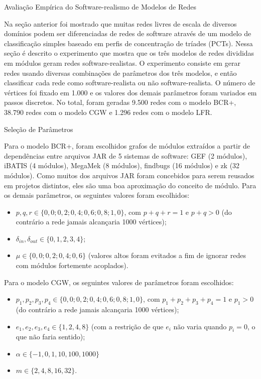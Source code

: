 \begin{section}{Avaliação Empírica do Software-realismo de Modelos de Redes}

Na seção anterior foi mostrado que muitas redes livres de escala de diversos domínios podem ser diferenciadas de redes de software através de um modelo de classificação simples baseado em perfis de concentração de tríades (PCTs). Nessa seção é descrito o experimento que mostra que os três modelos de redes divididas em módulos geram redes software-realistas. O experimento consiste em gerar redes usando diversas combinações de parâmetros dos três modelos, e então classificar cada rede como software-realista ou não software-realista. O número de vértices foi fixado em 1.000 e os valores dos demais parâmetros foram variados em passos discretos. No total, foram geradas 9.500 redes com o modelo BCR+, 38.790 redes com o modelo CGW e 1.296 redes com o modelo LFR.

\begin{subsection}{Seleção de Parâmetros}

Para o modelo BCR+, foram escolhidos grafos de módulos extraídos a partir de dependências entre arquivos JAR de 5 sistemas de software: GEF (2 módulos), iBATIS (4 módulos), MegaMek (8 módulos), findbugs (16 módulos) e zk (32 módulos). Como muitos dos arquivos JAR foram concebidos para serem reusados em projetos distintos, eles são uma boa aproximação do conceito de módulo. Para os demais parâmetros, os seguintes valores foram escolhidos:

\begin{itemize}
	\item $p, q, r \in \{0,0; 0,2; 0,4; 0,6; 0,8; 1,0\}$, com $p + q + r = 1$ e $p + q > 0$ (do contrário a rede jamais alcançaria 1000 vértices);
	\item $\delta_{in}, \delta_{out} \in \{0, 1, 2, 3, 4\}$;
	\item $\mu \in \{0,0; 0,2; 0,4; 0,6\}$ (valores altos foram evitados a fim de ignorar redes com módulos fortemente acoplados).
\end{itemize}

Para o modelo CGW, os seguintes valores de parâmetros foram escolhidos:

\begin{itemize}
	\item $p_1, p_2, p_3, p_4 \in \{0,0; 0,2; 0,4; 0,6; 0,8; 1,0\}$, com $p_1 + p_2 + p_3 + p_4 = 1$ e $p_1 > 0$ (do contrário a rede jamais alcançaria 1000 vértices);
	\item $e_1, e_2, e_3, e_4 \in \{1, 2, 4, 8\}$ (com a restrição de que $e_i$ não varia quando $p_i = 0$, o que não faria sentido);
	\item $\alpha \in \{-1, 0, 1, 10, 100, 1000\}$
	\item $m \in \{2, 4, 8, 16, 32\}$.
\end{itemize}


\end{subsection}
\end{section}
